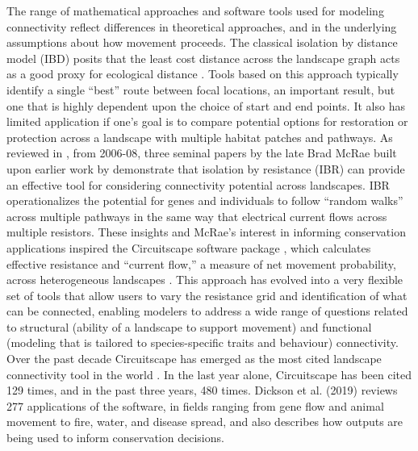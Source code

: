 \documentclass{juliacon}
\begin{document}
The range of mathematical approaches and software tools used for modeling connectivity reflect differences in theoretical approaches, and in the underlying assumptions about how movement proceeds. The classical isolation by distance model (IBD) posits that the least cost distance across the landscape graph acts as a good proxy for ecological distance \cite{wright1943isolation}.  Tools based on this approach typically identify a single “best” route between focal locations, an important result, but one that is highly dependent upon the choice of start and end points. It also has limited application if one’s goal is to compare potential options for restoration or protection across a landscape with multiple habitat patches and pathways.  As reviewed in \cite{dickson2019circuit}, from 2006-08, three seminal papers by the late Brad McRae built upon earlier work by \cite{doyle1984random} demonstrate that isolation by resistance (IBR)\cite{mcrae2006isolation} can provide an effective tool for considering connectivity potential across landscapes. IBR operationalizes the potential for genes and individuals to follow “random walks” across multiple pathways in the same way that electrical current flows across multiple resistors. These insights and McRae’s interest in informing conservation applications inspired the Circuitscape software package \cite{mcrae2008using}, which calculates effective resistance and “current flow,” a measure of net movement probability, across heterogeneous landscapes \cite{dickson2019circuit}.  This approach has evolved into a very flexible set of tools that allow users to vary the resistance grid and identification of what can be connected, enabling modelers to address a wide range of questions related to structural (ability of a landscape to support movement) and functional (modeling that is tailored to species-specific traits and behaviour) connectivity.  
Over the past decade Circuitscape has emerged as the most cited landscape connectivity tool in the world \cite{dickson2019circuit}. In the last year alone, Circuitscape has been cited 129 times, and in the past three years, 480 times. Dickson et al. (2019) reviews 277 applications of the software, in fields ranging from gene flow and animal movement to fire, water, and disease spread, and also describes how outputs are being used to inform conservation decisions. 
\end{document}
